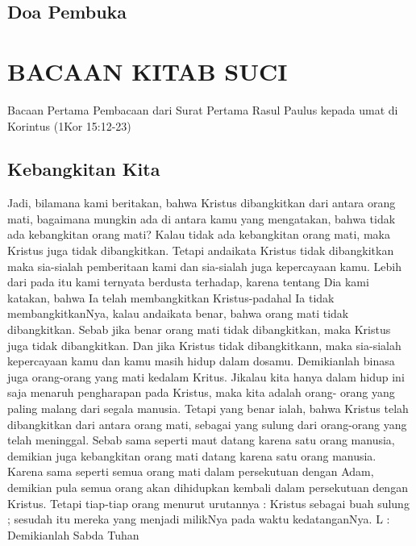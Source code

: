 \subsection*{Doa Pembuka}


\section*{BACAAN KITAB SUCI}

Bacaan Pertama
Pembacaan dari Surat Pertama Rasul Paulus kepada umat di
Korintus (1Kor 15:12-23)
\subsection*{Kebangkitan Kita}
Jadi, bilamana kami beritakan, bahwa Kristus dibangkitkan
dari antara orang mati, bagaimana mungkin ada di antara kamu
yang mengatakan, bahwa tidak ada kebangkitan orang mati?
Kalau tidak ada kebangkitan orang mati, maka Kristus juga
tidak dibangkitkan. Tetapi andaikata Kristus tidak dibangkitkan
maka sia-sialah pemberitaan kami dan sia-sialah juga
kepercayaan kamu. Lebih dari pada itu kami ternyata berdusta
terhadap, karena tentang Dia kami katakan, bahwa Ia telah
membangkitkan Kristus-padahal Ia tidak membangkitkanNya,
kalau andaikata benar, bahwa orang mati tidak dibangkitkan.
Sebab jika benar orang mati tidak dibangkitkan, maka Kristus
juga tidak dibangkitkan. Dan jika Kristus tidak dibangkitkann,
maka sia-sialah kepercayaan kamu dan kamu masih hidup
dalam dosamu. Demikianlah binasa juga orang-orang yang mati
kedalam Kritus. Jikalau kita hanya dalam hidup ini saja
menaruh pengharapan pada Kristus, maka kita adalah orang-
orang yang paling malang dari segala manusia. Tetapi yang
benar ialah, bahwa Kristus telah dibangkitkan dari antara orang
mati, sebagai yang sulung dari orang-orang yang telah
meninggal. Sebab sama seperti maut datang karena satu orang
manusia, demikian juga kebangkitan orang mati datang karena
satu orang manusia. Karena sama seperti semua orang mati
dalam persekutuan dengan Adam, demikian pula semua orang
akan dihidupkan kembali dalam persekutuan dengan Kristus.
Tetapi tiap-tiap orang menurut urutannya : Kristus sebagai buah
sulung ; sesudah itu mereka yang menjadi milikNya pada waktu
kedatanganNya.
L : Demikianlah Sabda Tuhan

